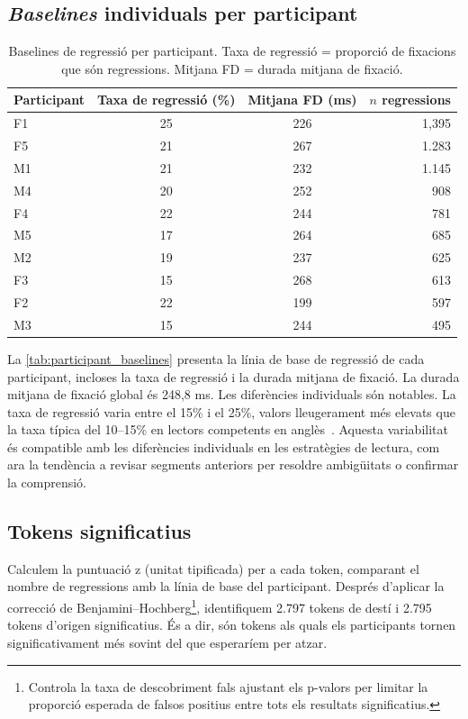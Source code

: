\subsection{\textit{Baselines} individuals per participant}

\iftables
\begin{table}[htbp]
\small
\centering
\begin{tabular}{lccr}
\toprule
\textbf{Participant} & \textbf{Taxa de regressió (\%)} & \textbf{Mitjana FD (ms)} & \textbf{$n$ regressions} \\
\midrule
F1 & 25 & 226 & 1,395 \\
F5 & 21 & 267 & 1.283 \\
M1 & 21 & 232 & 1.145 \\
M4 & 20 & 252 & 908 \\
F4 & 22 & 244 & 781 \\
M5 & 17 & 264 & 685 \\
M2 & 19 & 237 & 625 \\
F3 & 15 & 268 & 613 \\
F2 & 22 & 199 & 597 \\
M3 & 15 & 244 & 495 \\
\bottomrule
\end{tabular}
\caption{Baselines de regressió per participant. Taxa de regressió = proporció de fixacions que són regressions. Mitjana FD = durada mitjana de fixació.}
\label{tab:participant_baselines}
\end{table}
\fi
La \autoref{tab:participant_baselines} presenta la línia de base de regressió de cada participant, incloses la taxa de regressió i la durada mitjana de fixació.
La durada mitjana de fixació global és 248,8 ms.
Les diferències individuals són notables.
La taxa de regressió varia entre el 15\% i el 25\%, valors lleugerament més elevats que la taxa típica del 10--15\% en lectors competents en anglès~\cite{conklinEyeTrackingGuideApplied2018}.
Aquesta variabilitat és compatible amb les diferències individuals en les estratègies de lectura, com ara la tendència a revisar segments anteriors per resoldre ambigüitats o confirmar la comprensió.

\subsection{Tokens significatius}

Calculem la puntuació z (unitat tipificada) per a cada token, comparant el nombre de regressions amb la línia de base del participant.
Després d'aplicar la correcció de Benjamini--Hochberg\footnote{Controla la taxa de descobriment fals ajustant els p-valors per limitar la proporció esperada de falsos positius entre tots els resultats significatius.}, identifiquem 2.797 tokens de destí i 2.795 tokens d'origen significatius.
És a dir, són tokens als quals els participants tornen significativament més sovint del que esperaríem per atzar.

